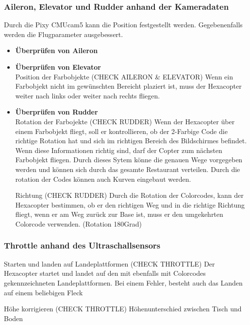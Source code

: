     \subsubsection{Aileron, Elevator und Rudder anhand der Kameradaten}
    Durch die Pixy CMUcam5 kann die Position festgestellt werden. Gegebenenfalls werden die Flugparameter ausgebessert.

      \begin{itemize}
        \item \textbf{Überprüfen von Aileron}\\
        \item \textbf{Überprüfen von Elevator}\\
        Position der Farbobjekte (CHECK AILERON \& ELEVATOR)
        Wenn ein Farbobjekt nicht im gewünschten Bereicht plaziert ist, muss der Hexacopter weiter nach links oder weiter nach rechts fliegen.
        \item \textbf{Überprüfen von Rudder}\\
        Rotation der Farbojekte (CHECK RUDDER)
        Wenn der Hexacopter über einem Farbobjekt fliegt, soll er kontrollieren, ob der 2-Farbige Code die richtige Rotation hat und sich im richtigen Bereich des Bildschirmes befindet. Wenn diese Informationen richtig sind, darf der Copter zum nächsten Farbobjekt fliegen.
        Durch dieses Sytem könne die genauen Wege vorgegeben werden und können sich durch das gesamte Restaurant verteilen. Durch die rotation der Codes können auch Kurven eingebaut werden.

        Richtung (CHECK RUDDER)
        Durch die Rotation der Colorcodes, kann der Hexacopter bestimmen, ob er den richtigen Weg und in die richtige Richtung fliegt, wenn er am Weg zurück zur Base ist, muss er den umgekehrten Colorcode verwenden. (Rotation 180Grad)
      \end{itemize}

    \subsubsection{Throttle anhand des Ultraschallsensors}

    Starten und landen auf Landeplattformen (CHECK THROTTLE)
    Der Hexacopter startet und landet auf den mit ebenfalls mit Colorcodes gekennzeichneten Landeplattformen.
    Bei einem Fehler, besteht auch das Landen auf einem beliebigen Fleck

    Höhe korrigieren (CHECK THROTTLE)
    Höhenunterschied zwischen Tisch und Boden

